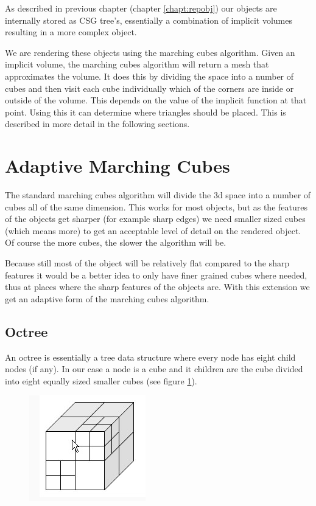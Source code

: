 \documentclass[a4paper,10pt,twoside]{report}
\begin{document}
As described in previous chapter (chapter \ref{chapt:repobj}) our objects are internally stored as CSG tree's, essentially a combination of implicit volumes resulting in a more complex object.

We are rendering these objects using the marching cubes algorithm. Given an implicit volume, the marching cubes algorithm will return a mesh that approximates the volume. It does this by dividing the space into a number of cubes and then visit each cube individually which of the corners are inside or outside of the volume. This depends on the value of the implicit function at that point. Using this it can determine where triangles should be placed. This is described in more detail in the following sections.

\section{Adaptive Marching Cubes}

The standard marching cubes algorithm will divide the 3d space into a number of cubes all of the same dimension. This works for most objects, but as the features of the objects get sharper (for example sharp edges) we need smaller sized cubes (which means more) to get an acceptable level of detail on the rendered object. Of course the more cubes, the slower the algorithm will be.

Because still most of the object will be relatively flat compared to the sharp features it would be a better idea to only have finer grained cubes where needed, thus at places where the sharp features of the objects are. With this extension we get an adaptive form of the marching cubes algorithm.

\subsection{Octree}

An octree is essentially a tree data structure where every node has eight child nodes (if any). In our case a node is a cube and it children are the cube divided into eight equally sized smaller cubes (see figure \ref{figure:octree}).

    \begin{figure}[h]
        \begin{center}
            \includegraphics[scale=0.4]{./images/octree}
        \end{center}
        \caption{}
        \label{figure:octree}
    \end{figure}
    
\end{document}
